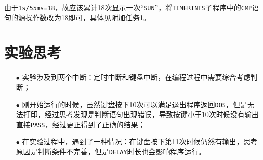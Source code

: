 \documentclass[11pt]{SEU-Digital-Report}
\begin{document}
由于\texttt{1s/55ms=18}，故应该累计18次显示一次“\texttt{SUN}”，将\texttt{TIMERINTS}子程序中的\texttt{CMP}语句的源操作数改为18即可，具体见附加任务1。

\section{实验思考}
\begin{enumerate}
    \item [$\bullet$] 实验涉及到两个中断：定时中断和键盘中断，在编程过程中需要综合考虑判断；
    \item [$\bullet$] 刚开始运行的时候，虽然键盘按下10次可以满足退出程序返回\texttt{DOS}，但是无法打印，经过思考发现是判断语句出现错误，导致按键小于10次时候没有输出直接\texttt{PASS}，经过更正得到了正确的结果；
    \item [$\bullet$]在实验过程中，遇到了一种情况：在键盘按下第11次时候仍然有输出，思考原因是判断条件不完善，但是\texttt{DELAY}时长也会影响程序运行。
\end{enumerate}


\printbibliography
\end{document}
